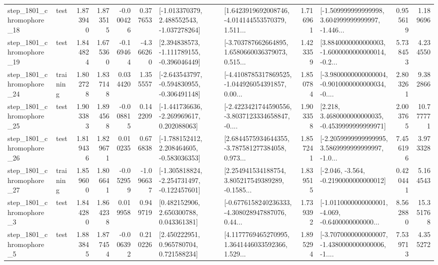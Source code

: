 \begin{tabular}{llrrrrllrlrr}
 step\_1801\_chromophore\_18 &      test &      1.873940 &    1.873515 &     -0.000426 &  0.377653 &   [-1.013370379, 2.488552543, -1.037278264] &  [1.6423919692008746, -4.014144553570379, 1.511... &       1.716961 &  [-1.509999999999998, 3.604999999999997, -1.446... &            0.955619 &          1.189696 \\
 step\_1801\_chromophore\_19 &      test &      1.844824 &    1.675360 &     -0.169464 & -4.366260 &   [2.394838573, -1.111789155, -0.396046449] &  [-3.703787662664895, 1.6580660036379073, 0.515... &       1.423359 &  [3.8840000000000003, -1.6000000000000014, -0.2... &            5.738453 &          4.234550 \\
 step\_1801\_chromophore\_24 &  training &      1.802728 &    1.837148 &      0.034420 &  1.355557 &  [-2.643543797, -0.594830955, -0.306491148] &  [-4.4108785317869525, -1.044926054391857, 0.00... &       1.850784 &  [-3.9800000000000004, -0.9010000000000034, -0.... &            2.803261 &          9.382866 \\
 step\_1801\_chromophore\_25 &      test &      1.903383 &    1.894568 &     -0.008815 &  0.142209 &   [-1.441736636, -2.269969617, 0.202088063] &  [-2.4223421744590556, -3.8037123334658847, -0.... &       1.903358 &   [2.218, 3.4680000000000035, -0.4539999999999971] &            2.003765 &         10.777771 \\
 step\_1801\_chromophore\_26 &      test &      1.819436 &    1.829671 &      0.010235 &  0.676838 &   [-1.788152412, 2.208464605, -0.583036353] &  [2.6844575934644355, -3.787581277384058, 0.973... &       1.857241 &  [-2.2059999999999995, 3.5869999999999997, -1.0... &            7.456196 &          3.973328 \\
 step\_1801\_chromophore\_27 &  training &      1.859600 &    1.806641 &     -0.052959 & -1.096637 &  [-1.305818824, -2.254731497, -0.122457601] &  [2.254941534188754, 3.805217549389289, -0.1585... &       1.839515 &              [-2.046, -3.564, -0.2190000000000012] &            0.420441 &          5.164543 \\
  step\_1801\_chromophore\_3 &      test &      1.844280 &    1.864238 &      0.019958 &  0.949719 &     [0.482152906, 2.650300788, 0.043361381] &  [-0.6776158240236333, -4.308028947887076, 0.44... &       1.739392 &  [-1.0110000000000001, -4.069, -0.6400000000000... &            8.562880 &         15.351768 \\
  step\_1801\_chromophore\_5 &      test &      1.883845 &    1.877454 &     -0.006392 &  0.210226 &     [2.450222951, 0.965780704, 0.721588234] &  [4.1177769465270995, 1.3641446033592366, 1.529... &       1.895294 &  [-3.7070000000000007, -1.4380000000000006, -1.... &            7.539713 &          4.355272 \\

\end{tabular}
